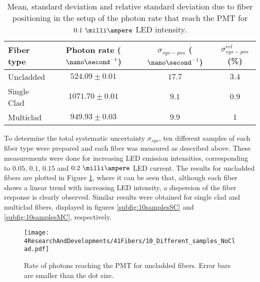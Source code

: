 \begin{table}[htbp]
\centering{}%
\begin{tabular}{lccc}
\toprule 
Fiber type & Photon rate ($\nano\second^{-1}$) & $\sigma_{sys-pos}$ ($\nano\second^{-1}$) & $\sigma^{rel}_{sys-pos}$ (\%) \tabularnewline
\midrule
\midrule 
Uncladded & $524.09 \pm 0.01$ & $17.7$ & $3.4$ \tabularnewline
Single Clad & $1071.70 \pm 0.01$ & $9.1$ & $0.9$ \tabularnewline
Multiclad & $949.93 \pm 0.03$ & $9.9$ & $1$ \tabularnewline
\bottomrule
\end{tabular}
\caption{Mean, standard deviation and relative standard deviation due to fiber positioning in the setup of the photon rate that reach the PMT for $0.1~\milli\ampere$ LED intensity.}
\label{tab:PositionStandardDeviation}
\end{table}



To determine the total systematic uncertainty $\sigma_{sys}$, ten different samples of each fiber type were prepared and each fiber was measured as described above. These measurements were done for increasing LED emission intensities, corresponding to $0.05$, $0.1$, $0.15$ and $0.2~\milli\ampere$ LED current. The results for uncladded fibers are plotted in Figure \ref{fig:10samplesNC}, where it can be seen that, although each fiber shows a linear trend with increasing LED intensity, a dispersion of the fiber response is clearly observed. Similar results were obtained for single clad and multiclad fibers, displayed in figures \ref{subfig:10samplesSC} and \ref{subfig:10samplesMC}, respectively.

\begin{figure}[h]
\centering
\texttt{[image: 4ResearchAndDevelopments/41Fibers/10\_Different\_samples\_NoClad.pdf]}
\caption{Rate of photons reaching the PMT for uncladded fibers. Error bars are smaller than the dot size.\label{fig:10samplesNC}}
\end{figure}

